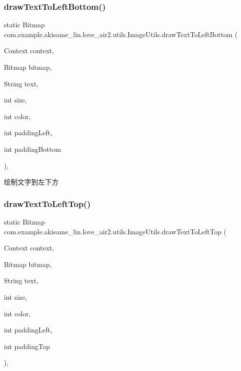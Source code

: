 \subsubsection{\texorpdfstring{drawTextToLeftBottom()}{drawTextToLeftBottom()}}
{\footnotesize\ttfamily static Bitmap com.\+example.\+akisame\+\_\+lin.\+love\+\_\+air2.\+utils.\+Image\+Utils.\+draw\+Text\+To\+Left\+Bottom (\begin{DoxyParamCaption}\item[{Context}]{context,  }\item[{Bitmap}]{bitmap,  }\item[{String}]{text,  }\item[{int}]{size,  }\item[{int}]{color,  }\item[{int}]{padding\+Left,  }\item[{int}]{padding\+Bottom }\end{DoxyParamCaption})\hspace{0.3cm}{\ttfamily [inline]}, {\ttfamily [static]}}

绘制文字到左下方 \mbox{\label{classcom_1_1example_1_1akisame__lin_1_1love__air2_1_1utils_1_1_image_utils_a9db72e957ae1387ccaa1fd09b8af2516}} 
\subsubsection{\texorpdfstring{drawTextToLeftTop()}{drawTextToLeftTop()}}
{\footnotesize\ttfamily static Bitmap com.\+example.\+akisame\+\_\+lin.\+love\+\_\+air2.\+utils.\+Image\+Utils.\+draw\+Text\+To\+Left\+Top (\begin{DoxyParamCaption}\item[{Context}]{context,  }\item[{Bitmap}]{bitmap,  }\item[{String}]{text,  }\item[{int}]{size,  }\item[{int}]{color,  }\item[{int}]{padding\+Left,  }\item[{int}]{padding\+Top }\end{DoxyParamCaption})\hspace{0.3cm}{\ttfamily [inline]}, {\ttfamily [static]}}

